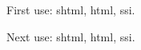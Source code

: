 \documentclass[12pt]{article}
\begin{document}
\tableofcontents
\section{}
First use: \gls{shtml}, \gls{html}, \gls{ssi}. 

Next use: \gls{shtml}, \gls{html}, \gls{ssi}. 

\printunsrtglossaries 
\end{document}
